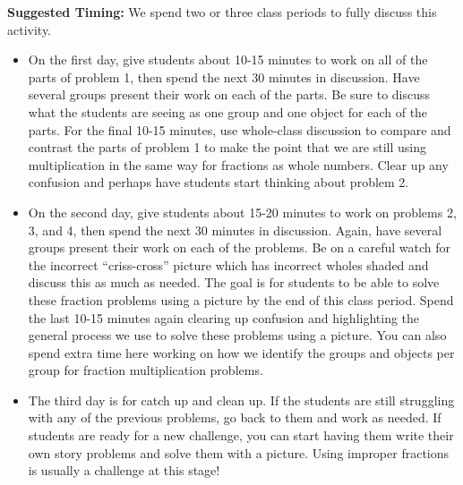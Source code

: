 \documentclass[nooutcomes,noauthor,handout]{ximera}
\begin{document}
\begin{instructorNotes}
{\bf Suggested Timing:} We spend two or three class periods to fully discuss this activity.  
\begin{itemize}
	\item On the first day, give students about 10-15 minutes to work on all of the parts of problem 1, then spend the next 30 minutes in discussion. Have several groups present their work on each of the parts. Be sure to discuss what the students are seeing as one group and one object for each of the parts. For the final 10-15 minutes, use whole-class discussion to compare and contrast the parts of problem 1 to make the point that we are still using multiplication in the same way for fractions as whole numbers. Clear up any confusion and perhaps have students start thinking about problem 2.
	\item On the second day, give students about 15-20 minutes to work on problems 2, 3, and 4, then spend the next 30 minutes in discussion. Again, have several groups present their work on each of the problems. Be on a careful watch for the incorrect ``criss-cross'' picture which has incorrect wholes shaded and discuss this as much as needed. The goal is for students to be able to solve these fraction problems using a picture by the end of this class period. Spend the last 10-15 minutes again clearing up confusion and highlighting the general process we use to solve these problems using a picture. You can also spend extra time here working on how we identify the groups and objects per group for fraction multiplication problems.
	\item The third day is for catch up and clean up. If the students are still struggling with any of the previous problems, go back to them and work as needed. If students are ready for a new challenge, you can start having them write their own story problems and solve them with a picture. Using improper fractions is usually a challenge at this stage!
\end{itemize}

\end{instructorNotes}
\end{document}
